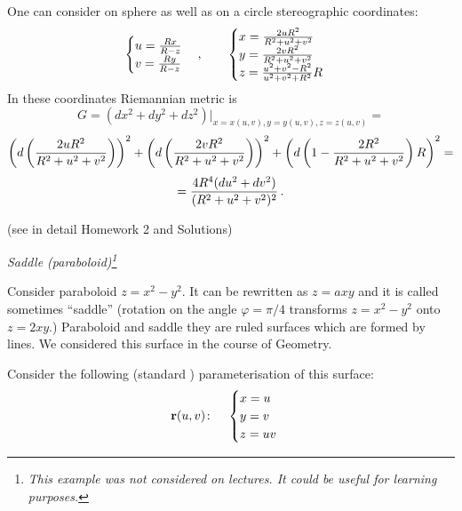 \documentclass[12pt]{article}
\theoremstyle{theorem}
\numberwithin{equation}{section}
\begin{document}
One can consider on sphere as well as on a circle stereographic coordinates:
                 \begin{equation}
                 \label{stereographiccoordinatesonsphere}
                           \begin{cases}
                    u={Rx\over R-z}
                 \cr
                 v={Ry\over R-z}\cr
                 \end{cases},
                 \qquad \begin{cases}
                 x={2uR^2\over R^2+u^2+v^2}\cr
                 y={2vR^2\over R^2+u^2+v^2}\cr
                 z={u^2+v^2-R^2\over u^2+v^2+R^2}R
                    \end{cases}
                    \end{equation}
In these coordinates Riemannian metric is
                     $$
G=(dx^2+dy^2+dz^2)\big\vert_{x=x(u,v),y=y(u,v),z=z(u,v)}=
                        $$
                        $$
  \left(d\left(2uR^2\over R^2+u^2+v^2\right)\right)^2+
                     \left(d\left(2vR^2\over R^2+u^2+v^2\right)\right)^2+
         \left(d\left(1-{2R^2\over R^2+u^2+v^2}\right)R\right)^2=
                        $$
                        $$
                        =
         {4R^4(du^2+dv^2)\over (R^2+u^2+v^2)^2}\,.
            $$



(see in detail Homework 2 and Solutions)

\m


\centerline {\it Saddle (paraboloid)\footnote{{\it This example was not
considered on lectures. It could be useful for learning purposes.}
}}

Consider paraboloid $z=x^2-y^2$.
It can be rewritten as $z=axy$ and it is called sometimes ``saddle''
(rotation on the angle $\varphi=\pi/4$ transforms $z=x^2-y^2$ onto $z=2xy$.)
{\footnotesize Paraboloid and saddle they are  ruled surfaces which are formed by lines.}
We considered this surface in the course of Geometry.

  Consider the following
(standard ) parameterisation
 of this surface:
\begin{equation}\label{surface3}
  {\bf r}(u,v)\colon\quad
  \begin{cases}
  x=u\\
  y=v\\
  z=uv\\
  \end{cases}
\end{equation}
\end{document}
